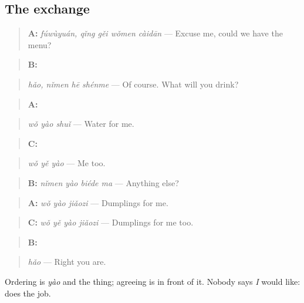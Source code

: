\subsection*{The exchange}
\begin{quote}
\textbf{A:} \emph{fúwùyuán, qǐng gěi wǒmen càidān} — Excuse me, could we have the menu?
\end{quote}

\begin{quote}
\textbf{B:}  
\end{quote}

\begin{quote}
\emph{hǎo, nǐmen hē shénme} — Of course. What will you drink?
\end{quote}

\begin{quote}
\textbf{A:} 
\end{quote}

\begin{quote}
\emph{wǒ yào shuǐ} — Water for me.
\end{quote}

\begin{quote}
\textbf{C:} 
\end{quote}

\begin{quote}
\emph{wǒ yě yào} — Me too.
\end{quote}

\begin{quote}
\textbf{B:} \emph{nǐmen yào biéde ma} — Anything else?
\end{quote}

\begin{quote}
\textbf{A:} \emph{wǒ yào jiǎozi} — Dumplings for me.
\end{quote}

\begin{quote}
\textbf{C:} \emph{wǒ yě yào jiǎozi} — Dumplings for me too.
\end{quote}

\begin{quote}
\textbf{B:} 
\end{quote}

\begin{quote}
\emph{hǎo} — Right you are.
\end{quote}

Ordering is \emph{yào} and the thing; agreeing is  in front of it. Nobody says \emph{I} would like:  does the job.

